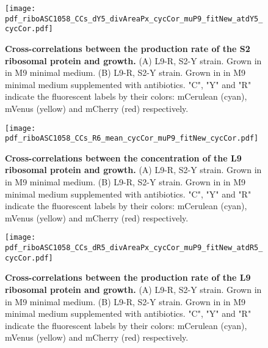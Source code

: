 \begin{figure}
    \centering
    \texttt{[image: pdf\_riboASC1058\_CCs\_dY5\_divAreaPx\_cycCor\_muP9\_fitNew\_atdY5\_cycCor.pdf]}
    \caption{ 
        \textbf{Cross-correlations between the production rate of the S2 ribosomal protein and growth.}
        (A) L9-R, S2-Y strain. Grown in in M9 minimal medium.
        (B) L9-R, S2-Y strain. Grown in in M9 minimal medium supplemented with antibiotics. 
        "C", "Y" and "R" indicate the fluorescent labels by their colors: mCerulean (cyan), mVenus (yellow) and mCherry (red) respectively.
%
    }
    \label{fig:ribo:CCsPmuS2}
\end{figure}





\begin{figure}
    \centering
    \texttt{[image: pdf\_riboASC1058\_CCs\_R6\_mean\_cycCor\_muP9\_fitNew\_cycCor.pdf]}
    \caption{ 
        \textbf{Cross-correlations between the concentration of the L9 ribosomal protein and growth.}
        (A) L9-R, S2-Y strain. Grown in in M9 minimal medium.
        (B) L9-R, S2-Y strain. Grown in in M9 minimal medium supplemented with antibiotics. 
        "C", "Y" and "R" indicate the fluorescent labels by their colors: mCerulean (cyan), mVenus (yellow) and mCherry (red) respectively.
%
    }
    \label{fig:ribo:CCsEmuL9}
\end{figure}

\begin{figure}
    \centering
    \texttt{[image: pdf\_riboASC1058\_CCs\_dR5\_divAreaPx\_cycCor\_muP9\_fitNew\_atdR5\_cycCor.pdf]}
    \caption{ 
        \textbf{Cross-correlations between the production rate of the L9 ribosomal protein and growth.}
        (A) L9-R, S2-Y strain. Grown in in M9 minimal medium.
        (B) L9-R, S2-Y strain. Grown in in M9 minimal medium supplemented with antibiotics. 
        "C", "Y" and "R" indicate the fluorescent labels by their colors: mCerulean (cyan), mVenus (yellow) and mCherry (red) respectively.
%
    }
    \label{fig:ribo:CCsPmuL9}
\end{figure}

